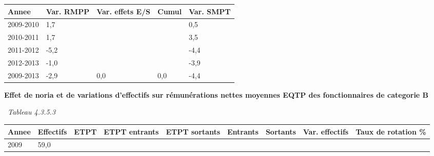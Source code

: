 \begin{longtable}[]{@{}lllll@{}}
\toprule
Annee & Var. RMPP & Var. effets E/S & Cumul & Var. SMPT\tabularnewline
\midrule
\endhead
2009-2010 & 1,7 & & & 0,5\tabularnewline
2010-2011 & 1,7 & & & 3,5\tabularnewline
2011-2012 & -5,2 & & & -4,4\tabularnewline
2012-2013 & -1,0 & & & -3,9\tabularnewline
2009-2013 & -2,9 & 0,0 & 0,0 & -4,4\tabularnewline
\bottomrule
\end{longtable}

\textbf{Effet de noria et de variations d'effectifs sur rémunérations
nettes moyennes EQTP des fonctionnaires de categorie B}

~\emph{Tableau 4.3.5.3}

\begin{longtable}[]{@{}lllllllll@{}}
\toprule
\begin{minipage}[b]{0.05\columnwidth}\raggedright
Annee\strut
\end{minipage} & \begin{minipage}[b]{0.08\columnwidth}\raggedright
Effectifs\strut
\end{minipage} & \begin{minipage}[b]{0.04\columnwidth}\raggedright
ETPT\strut
\end{minipage} & \begin{minipage}[b]{0.10\columnwidth}\raggedright
ETPT entrants\strut
\end{minipage} & \begin{minipage}[b]{0.10\columnwidth}\raggedright
ETPT sortants\strut
\end{minipage} & \begin{minipage}[b]{0.07\columnwidth}\raggedright
Entrants\strut
\end{minipage} & \begin{minipage}[b]{0.07\columnwidth}\raggedright
Sortants\strut
\end{minipage} & \begin{minipage}[b]{0.11\columnwidth}\raggedright
Var. effectifs\strut
\end{minipage} & \begin{minipage}[b]{0.14\columnwidth}\raggedright
Taux de rotation \%\strut
\end{minipage}\tabularnewline
\midrule
\endhead
\begin{minipage}[t]{0.05\columnwidth}\raggedright
2009\strut
\end{minipage} & \begin{minipage}[t]{0.08\columnwidth}\raggedright
59,0\strut
\end{minipage} & \begin{minipage}[t]{0.04\columnwidth}\raggedright

\end{minipage}
\end{longtable}
